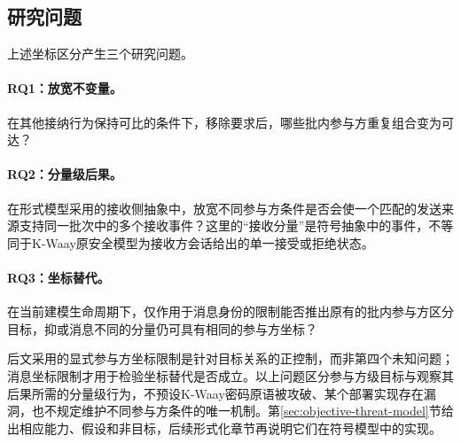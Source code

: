 \subsection{研究问题}

上述坐标区分产生三个研究问题。

\paragraph{RQ1：放宽不变量。}
在其他接纳行为保持可比的条件下，移除\distinctparty 要求后，哪些批内参与方重复组合变为可达？

\paragraph{RQ2：分量级后果。}
在形式模型采用的接收侧抽象中，放宽不同参与方条件是否会使一个匹配的发送来源支持同一批次中的多个接收事件？这里的“接收分量”是符号抽象中的事件，不等同于K-Waay原安全模型为接收方会话给出的单一接受或拒绝状态。

\paragraph{RQ3：坐标替代。}
在当前建模生命周期下，仅作用于消息身份的限制能否推出原有的批内参与方区分目标，抑或消息不同的分量仍可具有相同的参与方坐标？

后文采用的显式参与方坐标限制是针对目标关系的正控制，而非第四个未知问题；消息坐标限制才用于检验坐标替代是否成立。以上问题区分参与方级目标与观察其后果所需的分量级行为，不预设K-Waay密码原语被攻破、某个部署实现存在漏洞，也不规定维护不同参与方条件的唯一机制。第\ref{sec:objective-threat-model}节给出相应能力、假设和非目标，后续形式化章节再说明它们在符号模型中的实现。
